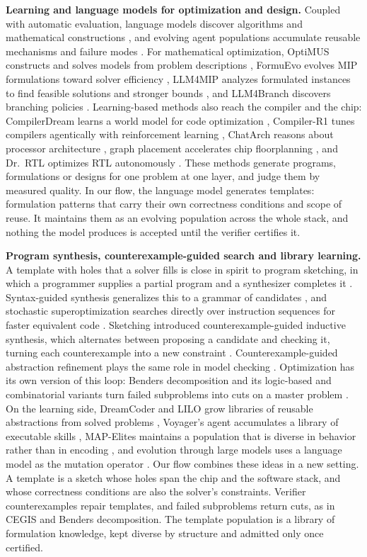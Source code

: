 \documentclass[11pt]{article}
\begin{document}
\textbf{Learning and language models for optimization and design.} Coupled with automatic evaluation, language models discover algorithms and mathematical constructions \cite{r1,r2}, and evolving agent populations accumulate reusable mechanisms and failure modes \cite{r5}. For mathematical optimization, OptiMUS constructs and solves models from problem descriptions \cite{r3}, FormuEvo evolves MIP formulations toward solver efficiency \cite{r4}, LLM4MIP analyzes formulated instances to find feasible solutions and stronger bounds \cite{r29}, and LLM4Branch discovers branching policies \cite{r32}. Learning-based methods also reach the compiler and the chip: CompilerDream learns a world model for code optimization \cite{r30}, Compiler-R1 tunes compilers agentically with reinforcement learning \cite{r31}, ChatArch reasons about processor architecture \cite{r6}, graph placement accelerates chip floorplanning \cite{r7}, and Dr.~RTL optimizes RTL autonomously \cite{r8}. These methods generate programs, formulations or designs for one problem at one layer, and judge them by measured quality. In our flow, the language model generates templates: formulation patterns that carry their own correctness conditions and scope of reuse. It maintains them as an evolving population across the whole stack, and nothing the model produces is accepted until the verifier certifies it.

\textbf{Program synthesis, counterexample-guided search and library learning.} A template with holes that a solver fills is close in spirit to program sketching, in which a programmer supplies a partial program and a synthesizer completes it \cite{r64}. Syntax-guided synthesis generalizes this to a grammar of candidates \cite{r61}, and stochastic superoptimization searches directly over instruction sequences for faster equivalent code \cite{r62}. Sketching introduced counterexample-guided inductive synthesis, which alternates between proposing a candidate and checking it, turning each counterexample into a new constraint \cite{r64}. Counterexample-guided abstraction refinement plays the same role in model checking \cite{r63}. Optimization has its own version of this loop: Benders decomposition and its logic-based and combinatorial variants turn failed subproblems into cuts on a master problem \cite{r65,r66,r67}. On the learning side, DreamCoder and LILO grow libraries of reusable abstractions from solved problems \cite{r68,r69}, Voyager's agent accumulates a library of executable skills \cite{r70}, MAP-Elites maintains a population that is diverse in behavior rather than in encoding \cite{r71}, and evolution through large models uses a language model as the mutation operator \cite{r72}. Our flow combines these ideas in a new setting. A template is a sketch whose holes span the chip and the software stack, and whose correctness conditions are also the solver's constraints. Verifier counterexamples repair templates, and failed subproblems return cuts, as in CEGIS and Benders decomposition. The template population is a library of formulation knowledge, kept diverse by structure and admitted only once certified.
\end{document}
